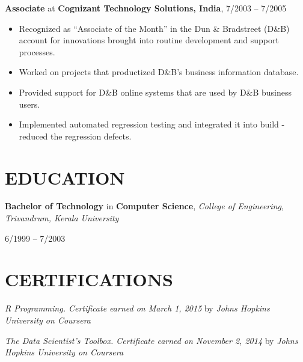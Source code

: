 \documentclass[10pt]{article}
\begin{document}
\begin{cvitem}
\textbf{Associate} at \textbf{Cognizant Technology Solutions, India}, 7/2003 -- 7/2005\par
\begin{itemize}
	\item Recognized as ``Associate of the Month'' in the Dun \& Bradstreet (D\&B) account for innovations brought into routine development and support processes.
	\item Worked on projects that productized D\&B's business information database.
	\item Provided support for D\&B online systems that are used by D\&B business users.
	\item Implemented automated regression testing and integrated it into build - reduced the regression defects.
\end{itemize}
\end{cvitem}

\section*{EDUCATION}
\begin{cvitem}
\textbf{Bachelor of Technology} in \textbf{Computer Science}, \textit{College of Engineering, Trivandrum, Kerala University}\par
6/1999 -- 7/2003\par
\end{cvitem}

\section*{CERTIFICATIONS}
\begin{cvitem}
\textit{R Programming. Certificate earned on March 1, 2015} by \textit{Johns Hopkins University on Coursera}\par
\end{cvitem}
\begin{cvitem}
\textit{The Data Scientist's Toolbox. Certificate earned on November 2, 2014} by \textit{Johns Hopkins University on Coursera}\par
\end{cvitem}
\end{document}
